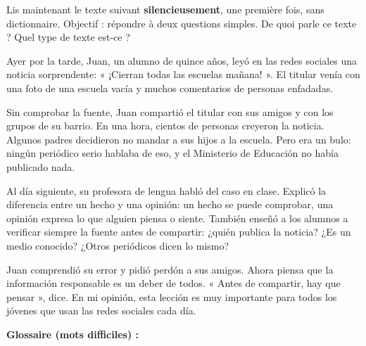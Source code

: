 \documentclass[11pt]{article}
\begin{document}
Lis maintenant le texte suivant \textbf{silencieusement}, une première fois, sans dictionnaire. Objectif : répondre à deux questions simples. De quoi parle ce texte ? Quel type de texte est-ce ?

\begin{textebox}
Ayer por la tarde, Juan, un alumno de quince años, leyó en las redes sociales una noticia sorprendente: « ¡Cierran todas las escuelas mañana! ». El titular venía con una foto de una escuela vacía y muchos comentarios de personas enfadadas.

Sin comprobar la fuente, Juan compartió el titular con sus amigos y con los grupos de su barrio. En una hora, cientos de personas creyeron la noticia. Algunos padres decidieron no mandar a sus hijos a la escuela. Pero era un bulo: ningún periódico serio hablaba de eso, y el Ministerio de Educación no había publicado nada.

Al día siguiente, su profesora de lengua habló del caso en clase. Explicó la diferencia entre un hecho y una opinión: un hecho se puede comprobar, una opinión expresa lo que alguien piensa o siente. También enseñó a los alumnos a verificar siempre la fuente antes de compartir: ¿quién publica la noticia? ¿Es un medio conocido? ¿Otros periódicos dicen lo mismo?

Juan comprendió su error y pidió perdón a sus amigos. Ahora piensa que la información responsable es un deber de todos. « Antes de compartir, hay que pensar », dice. En mi opinión, esta lección es muy importante para todos los jóvenes que usan las redes sociales cada día.
\end{textebox}

\textbf{Glossaire (mots difficiles) :}
\end{document}
